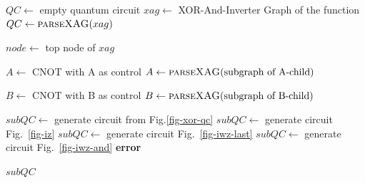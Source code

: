 \documentclass[conference]{IEEEtran}
\begin{document}
\begin{algorithm}
\caption{Existing Method}
\begin{algorithmic}[1]

\State $QC \gets$ empty quantum circuit
\State $xag \gets$ XOR-And-Inverter Graph of the function
\State $QC \gets \textsc{parseXAG}(xag)$

    \State $node \gets$ top node of $xag$
    
        \State $A \gets$ CNOT with A as control
    \Else
        \State $A \gets \textsc{parseXAG}(\text{subgraph of A-child})$
    \EndIf

        \State $B \gets$ CNOT with B as control
    \Else
        \State $B \gets \textsc{parseXAG}(\text{subgraph of B-child})$
    \EndIf

        \State $subQC \gets$ generate circuit from Fig.\ref{fig-xor-qc}
            \State $subQC \gets$ generate circuit Fig.~\ref{fig-iz}
            \State $subQC \gets$ generate circuit Fig.~\ref{fig-iwz-last}
            \State $subQC \gets$ generate circuit Fig.~\ref{fig-iwz-and}
        \Else
            \State \textbf{error}
        \EndIf
    \EndIf

    \State \Return $subQC$
\EndFunction

\end{algorithmic}
\end{algorithm}
\end{document}
